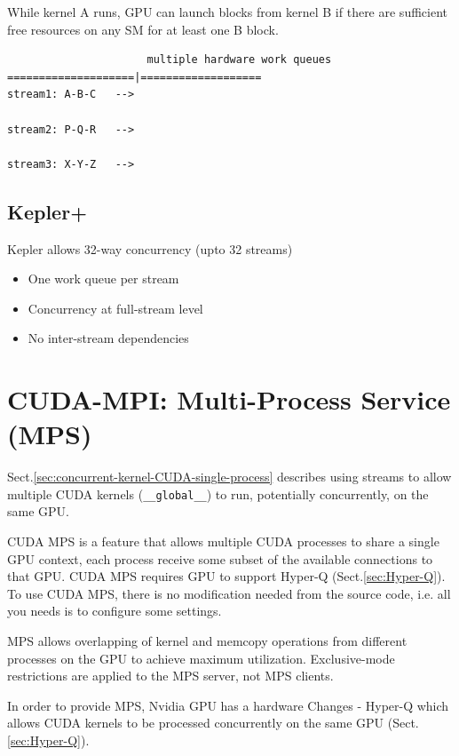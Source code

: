 While kernel A runs, GPU can launch blocks from kernel B if there are sufficient
free resources on any SM for at least one B block.

\begin{verbatim}
                      multiple hardware work queues
====================|===================
stream1: A-B-C   --> 

stream2: P-Q-R   --> 

stream3: X-Y-Z   --> 

\end{verbatim}

\subsection{Kepler+}

Kepler allows 32-way concurrency (upto 32 streams)
\begin{itemize}
  \item One work queue per stream
  
  \item Concurrency at full-stream level
  
  \item No inter-stream dependencies
\end{itemize}



\section{CUDA-MPI: Multi-Process Service (MPS) }
\label{sec:MPS-CUDA}
\label{sec:Multi-Process-Service}

Sect.\ref{sec:concurrent-kernel-CUDA-single-process} describes using streams to
allow multiple CUDA kernels (\verb!__global__!) to run, potentially
concurrently, on the same GPU.

CUDA MPS is a feature that allows multiple CUDA processes to share a single GPU
context, each process receive some subset of the available connections to that
GPU. CUDA MPS requires GPU to support Hyper-Q (Sect.\ref{sec:Hyper-Q}). To use
CUDA MPS, there is no modification needed from the source code, i.e. all you
needs is to configure some settings.

MPS allows overlapping of kernel and memcopy operations from different processes
on the GPU to achieve maximum utilization. Exclusive-mode restrictions are
applied to the MPS server, not MPS clients.

In order to provide MPS, Nvidia GPU has a hardware Changes - Hyper-Q which
allows CUDA kernels to be processed concurrently on the same GPU
(Sect.\ref{sec:Hyper-Q}).

